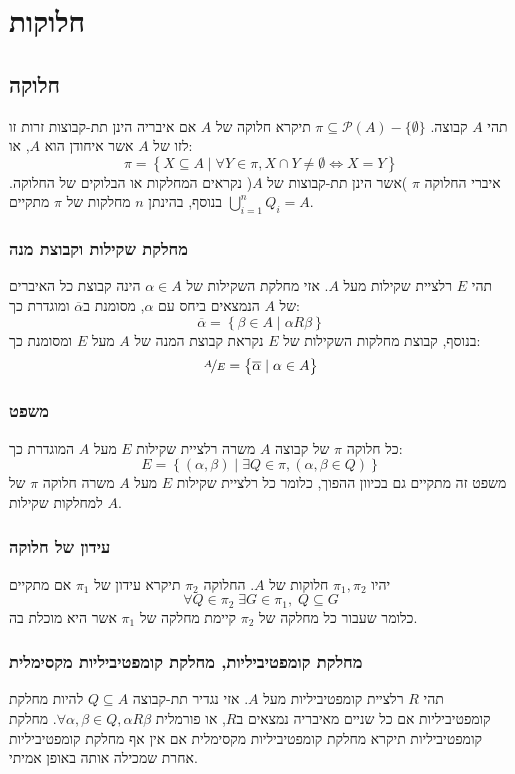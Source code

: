 \documentclass[11pt, oneside]{article}
\begin{document}
\clearpage
\section*{חלוקות}
\subsection*{חלוקה}
תהי $A$ קבוצה. $\pi \subseteq \mathcal{P}(A) - \{\emptyset\}$ תיקרא חלוקה של $A$ אם איבריה הינן תת-קבוצות זרות זו לזו של $A$ אשר איחודן הוא $A$, או:
\[
\pi = \left\{X \subseteq A \mid \forall Y \in \pi, X \cap Y \neq \emptyset \iff X = Y\right\}
\]
איברי החלוקה $\pi$ )אשר הינן תת-קבוצות של $A$( נקראים המחלקות או הבלוקים של החלוקה. בנוסף, בהינתן $n$ מחלקות של $\pi$ מתקיים $\bigcup^{n}_{i = 1}Q_{i} = A$.

\subsubsection*{מחלקת שקילות וקבוצת מנה}
תהי $E$ רלציית שקילות מעל $A$. אזי מחלקת השקילות של $\alpha \in A$ הינה קבוצת כל האיברים של $A$ הנמצאים ביחס עם $\alpha$, מסומנת ב$\overline{\alpha}$ ומוגדרת כך:
\[
\overline{\alpha} = \left\{\beta \in A \mid \alpha R \beta\right\}
\]
בנוסף, קבוצת מחלקות השקילות של $E$ נקראת קבוצת המנה של $A$ מעל $E$ ומסומנת כך:
\[
\nicefrac{A}{E} = \left\{\overline{\alpha} \mid \alpha \in A\right\}
\]

\subsubsection*{משפט}
כל חלוקה $\pi$ של קבוצה $A$ משרה רלציית שקילות $E$ מעל $A$ המוגדרת כך:
\[
E = \left\{(\alpha, \beta) \mid \exists Q \in \pi, (\alpha, \beta \in Q)\right\}
\]
משפט זה מתקיים גם בכיוון ההפוך, כלומר כל רלציית שקילות $E$ מעל $A$ משרה חלוקה $\pi$ של $A$ למחלקות שקילות.

\subsubsection*{עידון של חלוקה}
יהיו $\pi_{1}, \pi_{2}$ חלוקות של $A$. החלוקה $\pi_{2}$ תיקרא עידון של $\pi_{1}$ אם מתקיים
\[
\forall Q \in \pi_{2}\;\exists G \in \pi_{1},\;Q \subseteq G
\]
כלומר שעבור כל מחלקה של $\pi_{2}$ קיימת מחלקה של $\pi_{1}$ אשר היא מוכלת בה.

\subsubsection*{מחלקת קומפטיביליות, מחלקת קומפטיביליות מקסימלית}
תהי $R$ רלציית קומפטיביליות מעל $A$. אזי נגדיר תת-קבוצה $Q \subseteq A$ להיות מחלקת קומפטיביליות אם כל שניים מאיבריה נמצאים ב$R$, או פורמלית $\forall \alpha, \beta \in Q, \alpha R \beta$. מחלקת קומפטיביליות תיקרא מחלקת קומפטיביליות מקסימלית אם אין אף מחלקת קומפטיביליות אחרת שמכילה אותה באופן אמיתי\footnotemark.
\end{document}
